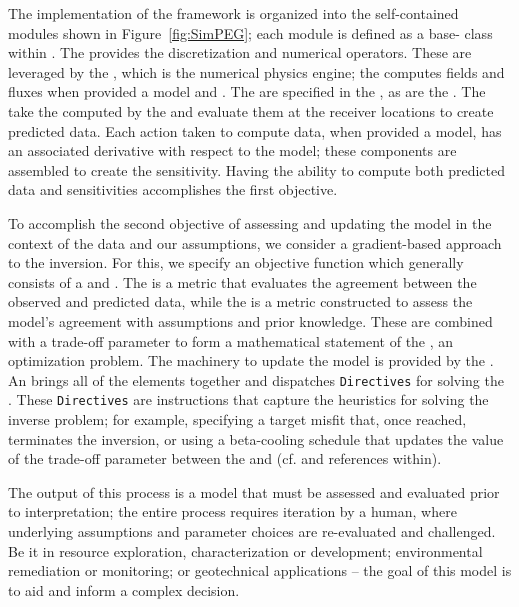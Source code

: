 The implementation of the framework is organized into the self-contained
modules shown in Figure~\ref{fig:SimPEG}; each module is defined as a base-
class within \SimPEG. The \Mesh provides the discretization and numerical
operators. These are leveraged by the \Problem, which is the numerical physics
engine; the \Problem computes fields and fluxes when provided a model and \Sources. The
\Sources are specified in the \Survey, as are the \Receivers. The \Receivers
take the \Fields computed by the \Problem and evaluate them at the receiver
locations to create predicted data. Each action taken to compute data, when
provided a model, has an associated derivative with respect to the model;
these components are assembled to create the sensitivity. Having the ability
to compute both predicted data and sensitivities accomplishes the first
objective.

To accomplish the second objective of assessing and updating the model in the context of the
data and our assumptions, we consider a gradient-based approach to the
inversion. For this, we specify an objective function which generally consists of a
\DataMisfit and \Regularization. The \DataMisfit is a metric that evaluates
the agreement between the observed and predicted data, while the
\Regularization is a metric constructed to assess the model's agreement with
assumptions and prior knowledge. These are combined with a trade-off parameter
to form a mathematical statement of the \InvProblem, an optimization problem.
The machinery to update the model is provided by the \Optimization. An
\Inversion brings all of the elements together and dispatches \texttt{Directives}
for solving the \InvProblem. These \texttt{Directives} are
instructions that capture the heuristics for solving the inverse problem; for
example, specifying a target misfit that, once reached, terminates the
inversion, or using a beta-cooling schedule that updates the value of the
trade-off parameter between the \DataMisfit and \Regularization (cf.
\cite{Parker1994, Oldenburg2005} and references within).

The output of this process is a model that must be assessed and evaluated
prior to interpretation; the entire process requires iteration by a human,
where underlying assumptions and parameter choices are re-evaluated and
challenged. Be it in resource exploration, characterization or development;
environmental remediation or monitoring; or geotechnical applications -- the
goal of this model is to aid and inform a complex decision.

\bigskip

